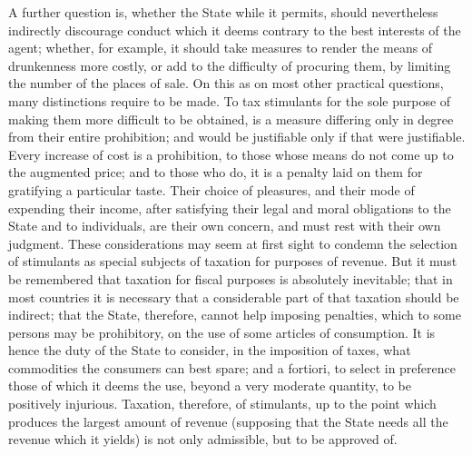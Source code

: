 \documentclass[12pt]{report}
\begin{document}
A further question is, whether the State while it permits, should nevertheless indirectly discourage conduct which it deems contrary to the best interests of the agent; whether, for example, it should take measures to render the means of drunkenness more costly, or add to the difficulty of procuring them, by limiting the number of the places of sale. On this as on most other practical questions, many distinctions require to be made. To tax stimulants for the sole purpose of making them more difficult to be obtained, is a measure differing only in degree from their entire prohibition; and would be justifiable only if that were justifiable. Every increase of cost is a prohibition, to those whose means do not come up to the augmented price; and to those who do, it is a penalty laid on them for gratifying a particular taste. Their choice of pleasures, and their mode of expending their income, after satisfying their legal and moral obligations to the State and to individuals, are their own concern, and must rest with their own judgment. These considerations may seem at first sight to condemn the selection of stimulants as special subjects of taxation for purposes of revenue. But it must be remembered that taxation for fiscal purposes is absolutely inevitable; that in most countries it is necessary that a considerable part of that taxation should be indirect; that the State, therefore, cannot help imposing penalties, which to some persons may be prohibitory, on the use of some articles of consumption. It is hence the duty of the State to consider, in the imposition of taxes, what commodities the consumers can best spare; and a fortiori, to select in preference those of which it deems the use, beyond a very moderate quantity, to be positively injurious. Taxation, therefore, of stimulants, up to the point which produces the largest amount of revenue (supposing that the State needs all the revenue which it yields) is not only admissible, but to be approved of.
\end{document}
